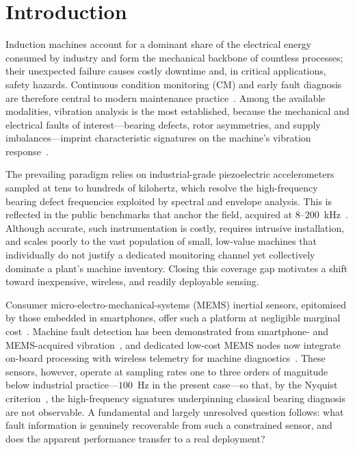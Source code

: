 
\section{Introduction}
\label{sec:intro}

Induction machines account for a dominant share of the electrical
energy consumed by industry and form the mechanical backbone of countless
processes; their unexpected failure causes costly downtime and, in critical
applications, safety hazards. Continuous condition monitoring (CM) and early
fault diagnosis are therefore central to modern maintenance
practice~\cite{gangsar2020signal, hamani2025advancements}. Among the available
modalities, vibration analysis is the most established, because the mechanical
and electrical faults of interest---bearing defects, rotor asymmetries, and
supply imbalances---imprint characteristic signatures on the machine's vibration
response~\cite{yang2021fault, zhang2020deep}.

The prevailing paradigm relies on industrial-grade piezoelectric accelerometers
sampled at tens to hundreds of kilohertz, which resolve the high-frequency
bearing defect frequencies exploited by spectral and envelope analysis. This is
reflected in the public benchmarks that anchor the field, acquired at
$8$--$200$~kHz~\cite{lee2024multidomain, sehri2024ottawa, thuan2023hust,
huang2018bearing}. Although accurate, such instrumentation is costly, requires
intrusive installation, and scales poorly to the vast population of small,
low-value machines that individually do not justify a dedicated monitoring channel
yet collectively dominate a plant's machine inventory. Closing this coverage gap
motivates a shift toward inexpensive, wireless, and readily deployable sensing.

Consumer micro-electro-mechanical-systems (MEMS) inertial sensors, epitomised by
those embedded in smartphones, offer such a platform at negligible marginal
cost~\cite{grouios2022accelerometers}. Machine fault detection has been demonstrated
from smartphone- and MEMS-acquired vibration~\cite{naha2017mobile,
ertargin2023deep, ertargin2025automated}, and dedicated low-cost MEMS nodes now
integrate on-board processing with wireless telemetry for machine
diagnostics~\cite{pedotti2020lowcost, jakobsen2024lowcost}. These sensors,
however, operate at sampling rates one to three orders of magnitude below
industrial practice---$100$~Hz in the present case---so that, by the Nyquist
criterion~\cite{nyquist1924certain, shannon1948mathematical}, the high-frequency
signatures underpinning classical bearing diagnosis are not observable. A
fundamental and largely unresolved question follows: what fault information is
genuinely recoverable from such a constrained sensor, and does the apparent
performance transfer to a real deployment?

